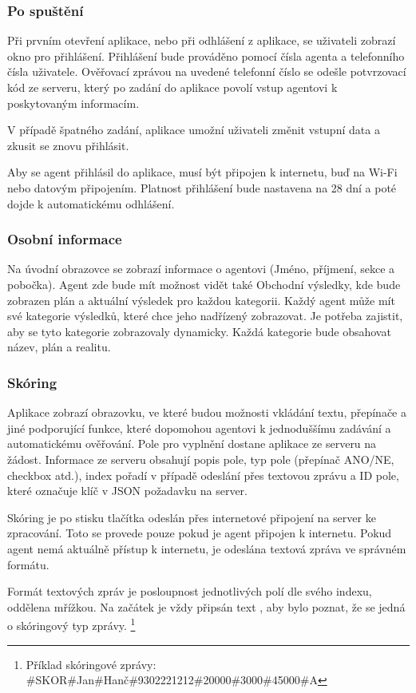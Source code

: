\documentclass[11pt,twoside,a4paper]{book}
\begin{document}
\subsubsection{Po spuštění} 
Při prvním otevření aplikace, nebo při odhlášení z aplikace, se uživateli zobrazí okno pro přihlášení. Přihlášení bude prováděno pomocí čísla agenta a telefonního čísla uživatele. Ověřovací zprávou na uvedené telefonní číslo se odešle potvrzovací kód ze serveru, který po zadání do aplikace povolí vstup agentovi k poskytovaným informacím.

V případě špatného zadání, aplikace umožní uživateli změnit vstupní data a zkusit se znovu přihlásit.

Aby se agent přihlásil do aplikace, musí být připojen k internetu, buď na Wi-Fi nebo datovým připojením. Platnost přihlášení bude nastavena na 28 dní a poté dojde k automatickému odhlášení.

\subsubsection{Osobní informace}
Na úvodní obrazovce se zobrazí informace o agentovi (Jméno, příjmení, sekce a pobočka). Agent zde bude mít možnost vidět také Obchodní výsledky, kde bude zobrazen plán a aktuální výsledek pro každou kategorii. Každý agent může mít své kategorie výsledků, které chce jeho nadřízený zobrazovat. Je potřeba zajistit, aby se tyto kategorie zobrazovaly dynamicky. Každá kategorie bude obsahovat název, plán a realitu.

\subsubsection{Skóring}
Aplikace zobrazí obrazovku, ve které budou možnosti vkládání textu, přepínače a jiné podporující funkce, které dopomohou agentovi k jednoduššímu zadávání a automatickému ověřování. Pole pro vyplnění dostane aplikace ze serveru na žádost. Informace ze serveru obsahují popis pole, typ pole (přepínač ANO/NE, checkbox atd.), index pořadí v případě odeslání přes textovou zprávu a ID pole, které označuje klíč v JSON požadavku na server.

Skóring je po stisku tlačítka  odeslán přes internetové připojení na server ke zpracování. Toto se provede pouze pokud je agent připojen k internetu. Pokud agent nemá aktuálně přístup k internetu, je odeslána textová zpráva ve správném formátu.

Formát textových zpráv je posloupnost jednotlivých polí dle svého indexu, oddělena mřížkou. Na začátek je vždy připsán text , aby bylo poznat, že se jedná o skóringový typ zprávy. \footnote{Příklad skóringové zprávy: \#SKOR\#Jan\#Hanč\#9302221212\#20000\#3000\#45000\#A}
\end{document}
